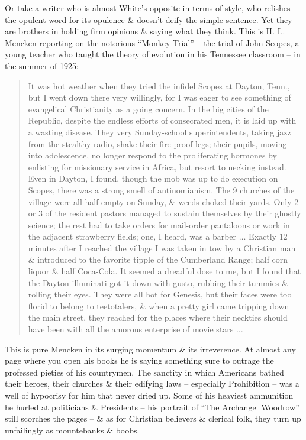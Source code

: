 \documentclass{article}
\begin{document}
Or take a writer who is almost White's opposite in terms of style, who relishes the opulent word for its opulence \& doesn't deify the simple sentence. Yet they are brothers in holding firm opinions \& saying what they think. This is H. L. Mencken reporting on the notorious ``Monkey Trial'' -- the trial of John Scopes, a young teacher who taught the theory of evolution in his Tennessee classroom -- in the summer of 1925:
\begin{quotation}
	It was hot weather when they tried the infidel Scopes at Dayton, Tenn., but I went down there very willingly, for I was eager to see something of evangelical Christianity as a going concern. In the big cities of the Republic, despite the endless efforts of consecrated men, it is laid up with a wasting disease. They very Sunday-school superintendents, taking jazz from the stealthy radio, shake their fire-proof legs; their pupils, moving into adolescence, no longer respond to the proliferating hormones by enlisting for missionary service in Africa, but resort to necking instead. Even in Dayton, I found, though the mob was up to do execution on Scopes, there was a strong smell of antinomianism. The 9 churches of the village were all half empty on Sunday, \& weeds choked their yards. Only 2 or 3 of the resident pastors managed to sustain themselves by their ghostly science; the rest had to take orders for mail-order pantaloons or work in the adjacent strawberry fields; one, I heard, was a barber $\ldots$ Exactly 12 minutes after I reached the village I was taken in tow by a Christian man \& introduced to the favorite tipple of the Cumberland Range; half corn liquor \& half Coca-Cola. It seemed a dreadful dose to me, but I found that the Dayton illuminati got it down with gusto, rubbing their tummies \& rolling their eyes. They were all hot for Genesis, but their faces were too florid to belong to teetotalers, \& when a pretty girl came tripping down the main street, they reached for the places where their neckties should have been with all the amorous enterprise of movie stars $\ldots$
\end{quotation}
This is pure Mencken in its surging momentum \& its irreverence. At almost any page where you open his books he is saying something sure to outrage the professed pieties of his countrymen. The sanctity in which Americans bathed their heroes, their churches \& their edifying laws -- especially Prohibition -- was a well of hypocrisy for him that never dried up. Some of his heaviest ammunition he hurled at politicians \& Presidents -- his portrait of ``The Archangel Woodrow'' still scorches the pages -- \& as for Christian believers \& clerical folk, they turn up unfailingly as mountebanks \& boobs.
\end{document}
